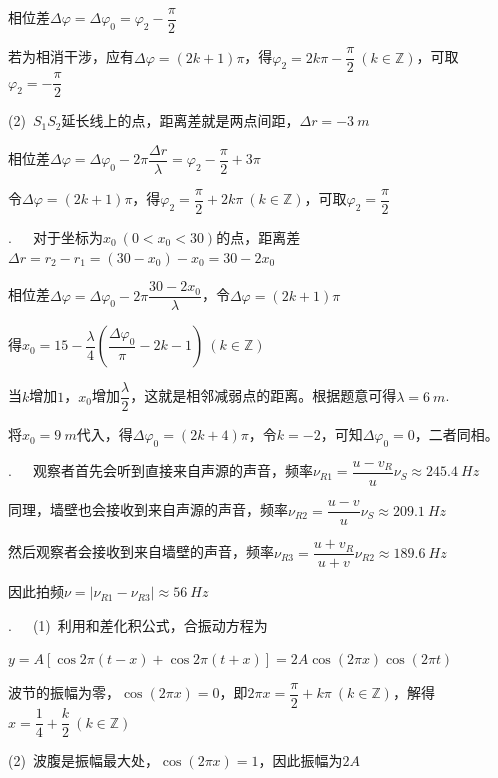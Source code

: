 相位差$\Delta \varphi=\Delta \varphi_0=\varphi_2-\dfrac{\pi}{2}$

若为相消干涉，应有$\Delta \varphi=(2k+1)\pi$，得$\varphi_2=2k\pi-\dfrac{\pi}{2}~(k\in\mathbb{Z})$，可取$\varphi_2=-\dfrac{\pi}{2}$

(2)~$S_1S_2$延长线上的点，距离差就是两点间距，$\Delta r=-\SI{3}{m}$

相位差$\Delta \varphi=\Delta \varphi_0-2\pi\dfrac{\Delta r}{\lambda}=\varphi_2-\dfrac{\pi}{2}+3\pi$

令$\Delta \varphi=(2k+1)\pi$，得$\varphi_2=\dfrac{\pi}{2}+2k\pi~(k\in \mathbb{Z})$，可取$\varphi_2=\dfrac{\pi}{2}$

\noindent\hdashrule{\textwidth}{1pt}{1pt}

.~~~对于坐标为$x_0~(0<x_0<30)$的点，距离差$\Delta r=r_2-r_1=(30-x_0)-x_0=30-2x_0$

相位差$\Delta \varphi=\Delta \varphi_0-2\pi\dfrac{30-2x_0}{\lambda}$，令$\Delta \varphi=(2k+1)\pi$

得$x_0=15-\dfrac{\lambda}{4}\left(\dfrac{\Delta \varphi_0}{\pi}-2k-1\right)~(k\in \mathbb{Z})$

当$k$增加$1$，$x_0$增加$\dfrac{\lambda}{2}$，这就是相邻减弱点的距离。根据题意可得$\lambda=\SI{6}{m}$.

将$x_0=\SI{9}{m}$代入，得$\Delta \varphi_0=(2k+4)\pi$，令$k=-2$，可知$\Delta \varphi_0=0$，二者同相。

\noindent\hdashrule{\textwidth}{1pt}{1pt}

.~~~观察者首先会听到直接来自声源的声音，频率$\nu_{R1}=\dfrac{u-v_R}{u}\nu_S\approx \SI{245.4}{Hz}$

同理，墙壁也会接收到来自声源的声音，频率$\nu_{R2}=\dfrac{u-v}{u}\nu_S\approx \SI{209.1}{Hz}$

然后观察者会接收到来自墙壁的声音，频率$\nu_{R3}=\dfrac{u+v_R}{u+v}\nu_{R2}\approx \SI{189.6}{Hz}$

因此拍频$\nu=|\nu_{R1}-\nu_{R3}|\approx \SI{56}{Hz}$


\newpage

.~~~(1)~利用和差化积公式，合振动方程为

$y=A[\cos 2\pi(t-x)+\cos 2\pi (t+x)]=2A\cos(2\pi x)\cos(2\pi t)$

波节的振幅为零，$\cos(2\pi x)=0$，即$2\pi x=\dfrac{\pi}{2}+k\pi~(k\in\mathbb{Z})$，解得$x=\dfrac{1}{4}+\dfrac{k}{2}~(k\in\mathbb{Z})$

(2)~波腹是振幅最大处，$\cos(2\pi x)=1$，因此振幅为$2A$

